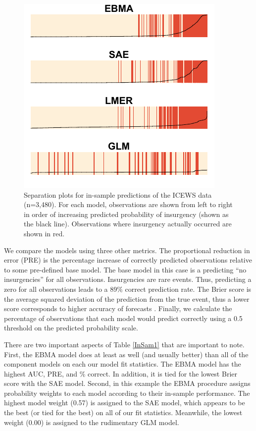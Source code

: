 \documentclass[pdftex,12pt,fullpage,oneside]{amsart}
\begin{document}
\begin{figure}
\caption{\footnotesize Separation plots for in-sample predictions of the ICEWS data (n=3,480).  For each model,
  observations are shown from left to right in order of increasing
  predicted probability of insurgency (shown as the black line).  Observations where
insurgency actually occurred are shown in red.}
\label{InSam1sep}
\begin{center}
\includegraphics[scale =.4]{Insamplenew.pdf}
\end{center}
\end{figure}

We compare the models using three other metrics.  The proportional
reduction in error (PRE) is the percentage increase of correctly
predicted observations relative to some pre-defined base model. The
base model in this case is a predicting ``no insurgencies'' for all
observations.  Insurgencies are rare events.  Thus, predicting a
zero for all observations leads to a 89\% correct prediction rate. The Brier
score is the average squared deviation of the prediction from the true
event, thus a lower score corresponds to higher accuracy of forecasts
\citep{Brier:1950}.  Finally, we calculate the percentage of
observations that each model would predict correctly using a 0.5
threshold on the predicted probability scale.

There are two important aspects of Table \ref{InSam1} that are
important to note.  First, the EBMA model does at least as well (and
usually better) than all of the component models on each our model fit
statistics.  The EBMA model has the highest AUC, PRE, and \% correct.
In addition, it is tied for the lowest Brier score with the SAE model.
Second, in this example the EBMA procedure assigns probability weights
to each model according to their in-sample performance.  The highest
model weight (0.57) is assigned to the SAE model, which appears to be
the best (or tied for the best) on all of our fit
statistics. Meanwhile, the lowest weight (0.00) is assigned to the
rudimentary GLM model.
\end{document}
